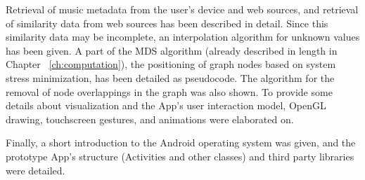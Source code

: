 Retrieval of music metadata from the user's device and web sources, and retrieval of similarity data from web sources has been described in detail. Since this similarity data may be incomplete, an interpolation algorithm for unknown values has been given.
A part of the MDS algorithm (already described in length in Chapter ~\ref{ch:computation}), the  positioning of graph nodes based on system stress minimization, has been detailed as pseudocode. The algorithm for the removal of node overlappings in the graph was also shown.
To provide some details about visualization and the App's user interaction model, OpenGL drawing, touchscreen gestures, and animations were elaborated on.

Finally, a short introduction to the Android operating system was given, and the prototype App's structure (Activities and other classes) and third party libraries were detailed.